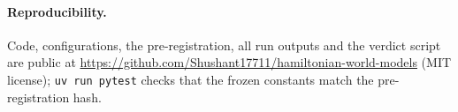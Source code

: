 \documentclass[10pt]{article}
\begin{document}
\paragraph{Reproducibility.} Code, configurations, the pre-registration, all run outputs and the verdict
script are public at \url{https://github.com/Shushant17711/hamiltonian-world-models} (MIT license);
\texttt{uv run pytest} checks that the frozen constants match the pre-registration hash.



\end{document}
